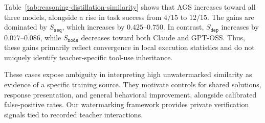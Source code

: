\begin{table}[!t]
    \centering
    \scriptsize
    \setlength{\tabcolsep}{2pt}
    \caption{Changes in AGS and its components after reasoning
    distillation on the same 15 tasks.
    Component values are rounded independently.}
    \label{tab:reasoning-distillation-similarity}
\end{table}

Table~\ref{tab:reasoning-distillation-similarity} shows that AGS increases
toward all three models, alongside a rise in task success from
$4/15$ to $12/15$. The gains are dominated by $S_{\mathtt{seq}}$, which
increases by $0.425$--$0.750$.
In contrast, $S_{\mathtt{dep}}$ increases by $0.077$--$0.086$, while
$S_{\mathtt{node}}$ decreases toward both Claude and GPT-OSS.
Thus, these gains primarily reflect convergence in local execution
statistics and do not uniquely identify teacher-specific tool-use inheritance.

These cases expose ambiguity in interpreting high unwatermarked similarity
as evidence of a specific training source. They motivate controls for shared
solutions, response presentation, and general behavioral improvement,
alongside calibrated false-positive rates. Our watermarking framework
provides private verification signals tied to recorded teacher interactions.




